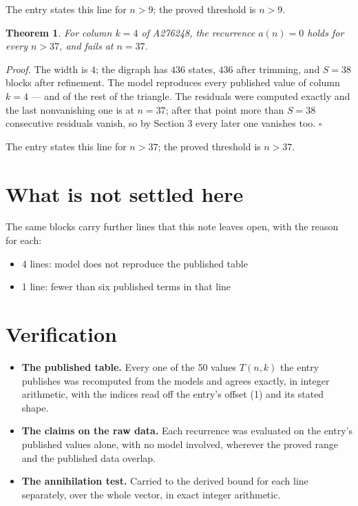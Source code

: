 \documentclass[11pt]{article}
\newtheorem{theorem}{Theorem}
\theoremstyle{definition}
\begin{document}
The entry states this line for $n > 9$; the proved threshold is $n > 9$.

\begin{theorem} For column $k = 4$ of A276248, the recurrence $a(n) = 0$ holds for every $n > 37$, and fails at $n = 37$.\end{theorem}

{\itshape Proof.} The width is $4$; the digraph has $436$ states, $436$ after trimming, and $S = 38$ blocks after refinement. The model reproduces every published value of column $k = 4$ --- and of the rest of the triangle. The residuals were computed exactly and the last nonvanishing one is at $n = 37$; after that point more than $S = 38$ consecutive residuals vanish, so by Section 3 every later one vanishes too. $\square$

The entry states this line for $n > 37$; the proved threshold is $n > 37$.

\section{What is not settled here}

The same blocks carry further lines that this note leaves open, with the reason for each:

\begin{itemize}

\item 4 lines: model does not reproduce the published table

\item 1 line: fewer than six published terms in that line

\end{itemize}

\section{Verification}

\begin{itemize}

\item {\bfseries The published table.} Every one of the 50 values $T(n,k)$ the entry publishes was recomputed from the models and agrees exactly, in integer arithmetic, with the indices read off the entry's offset (1) and its stated shape.

\item {\bfseries The claims on the raw data.} Each recurrence was evaluated on the entry's published values alone, with no model involved, wherever the proved range and the published data overlap.

\item {\bfseries The annihilation test.} Carried to the derived bound for each line separately, over the whole vector, in exact integer arithmetic.

\end{itemize}
\end{document}
